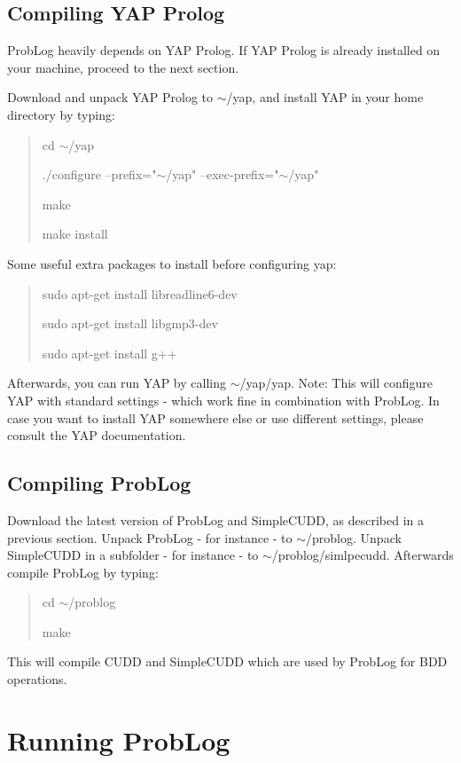 \documentclass[a4paper,12pt]{article}
\begin{document}
\subsection{Compiling YAP Prolog}

ProbLog heavily depends on YAP Prolog. If YAP Prolog is already installed on your machine, proceed to the next section.

Download and unpack YAP Prolog to $\sim$/yap, and install YAP in your home directory by typing:

\begin{quotation}
cd $\sim$/yap 

./configure --prefix="$\sim$/yap" --exec-prefix="$\sim$/yap"

make

make install
\end{quotation}

Some useful extra packages to install before configuring yap:
\begin{quotation}
sudo apt-get install libreadline6-dev

sudo apt-get install libgmp3-dev

sudo apt-get install g++
\end{quotation}

Afterwards, you can run YAP by calling $\sim$/yap/yap. Note: This will configure YAP with standard settings - which work fine in combination with ProbLog. In case you want to install YAP somewhere else or use different settings, please consult the YAP documentation. 

\subsection{Compiling ProbLog}

Download the latest version of ProbLog and SimpleCUDD, as described in a previous section. Unpack ProbLog - for instance - to $\sim$/problog. Unpack SimpleCUDD in a subfolder - for instance - to $\sim$/problog/simlpecudd. Afterwards compile ProbLog by typing:

\begin{quotation}
cd $\sim$/problog

make
\end{quotation}

This will compile CUDD and SimpleCUDD which are used by ProbLog for BDD operations.

\section{Running ProbLog}
\end{document}
